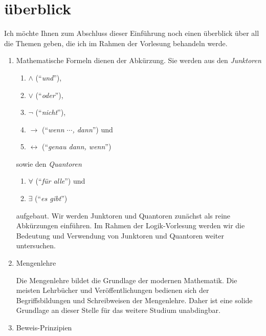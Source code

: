 
\section{\"{u}berblick}
Ich m\"{o}chte Ihnen zum Abschluss dieser Einf\"{u}hrung noch einen \"{u}berblick \"{u}ber all die Themen geben, die
ich im Rahmen der Vorlesung behandeln werde.  
\begin{enumerate}
\item Mathematische Formeln dienen der Abk\"{u}rzung.  Sie werden aus den \emph{Junktoren} 
      \begin{enumerate}
      \item $\wedge$ (``\emph{und}''),
      \item $\vee$ (``\emph{oder}''),
      \item $\neg$ (``\emph{nicht}''),
      \item $\rightarrow$ (``\emph{wenn $\cdots$, dann}'') und
      \item $\leftrightarrow$ (``\emph{genau dann, wenn}'') 
      \end{enumerate}
      sowie den \emph{Quantoren}
      \begin{enumerate}
      \item $\forall$ (``\emph{f\"{u}r alle}'') und
      \item $\exists$ (``\emph{es gibt}'') 
      \end{enumerate}
      aufgebaut.
      Wir werden  Junktoren und Quantoren zun\"{a}chst
      als reine Abk\"{u}rzungen einf\"{u}hren.  Im Rahmen der Logik-Vorlesung werden wir die Bedeutung
      und Verwendung von Junktoren und Quantoren weiter untersuchen.
\item Mengenlehre

      Die Mengenlehre bildet die Grundlage der modernen Mathematik.  Die meisten Lehrb\"{u}cher und
      Ver\"{o}ffentlichungen bedienen sich der Begriffsbildungen und Schreibweisen der Mengenlehre.
      Daher ist eine solide Grundlage an dieser Stelle f\"{u}r das weitere Studium unabdingbar.
\item Beweis-Prinzipien


\end{enumerate}
